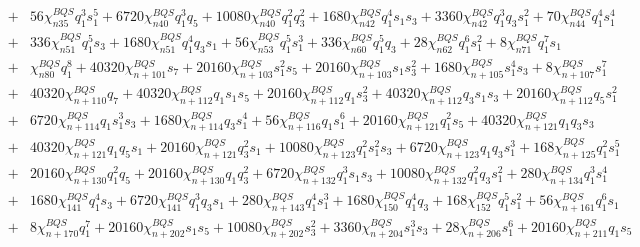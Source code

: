 \documentclass[pdflatex,prd,twocolumn,showpacs,superscriptaddress,nofootinbib]{revtex4-1}
\begin{document}
\begin{widetext}
\begin{eqnarray}
 &+& 56 \chi^{BQS}_{n35} q_{1}^{3} s_{1}^{5} 
 + 6720 \chi^{BQS}_{n40} q_{1}^{3} q_{5} + 10080 \chi^{BQS}_{n40} q_{1}^{2} q_{3}^{2}
 + 1680 \chi^{BQS}_{n42} q_{1}^{4} s_{1} s_{3} + 3360 \chi^{BQS}_{n42} q_{1}^{3} q_{3} s_{1}^{2} + 70 \chi^{BQS}_{n44} q_{1}^{4} s_{1}^{4} \nonumber \\
 &+& 336 \chi^{BQS}_{n51} q_{1}^{5} s_{3} + 1680 \chi^{BQS}_{n51} q_{1}^{4} q_{3} s_{1} + 56 \chi^{BQS}_{n53} q_{1}^{5} s_{1}^{3} 
 + 336 \chi^{BQS}_{n60} q_{1}^{5} q_{3} + 28 \chi^{BQS}_{n62} q_{1}^{6} s_{1}^{2}+ 8 \chi^{BQS}_{n71} q_{1}^{7} s_{1} \nonumber \\
 &+& \chi^{BQS}_{n80} q_{1}^{8} 
 + 40320 \chi^{BQS}_{n+101} s_{7} + 20160 \chi^{BQS}_{n+103} s_{1}^{2} s_{5} + 20160 \chi^{BQS}_{n+103} s_{1} s_{3}^{2} + 1680 \chi^{BQS}_{n+105} s_{1}^{4} s_{3} + 8 \chi^{BQS}_{n+107} s_{1}^{7} \nonumber \\
 &+& 40320 \chi^{BQS}_{n+110} q_{7}  
 + 40320 \chi^{BQS}_{n+112} q_{1} s_{1} s_{5} + 20160 \chi^{BQS}_{n+112} q_{1} s_{3}^{2} + 40320 \chi^{BQS}_{n+112} q_{3} s_{1} s_{3} 
 + 20160 \chi^{BQS}_{n+112} q_{5} s_{1}^{2} \nonumber \\
 &+& 6720 \chi^{BQS}_{n+114} q_{1} s_{1}^{3} s_{3} + 1680 \chi^{BQS}_{n+114} q_{3} s_{1}^{4} 
 + 56 \chi^{BQS}_{n+116} q_{1} s_{1}^{6} + 20160 \chi^{BQS}_{n+121} q_{1}^{2} s_{5} + 40320 \chi^{BQS}_{n+121} q_{1} q_{3} s_{3} \nonumber \\
 &+& 40320 \chi^{BQS}_{n+121} q_{1} q_{5} s_{1} + 20160 \chi^{BQS}_{n+121} q_{3}^{2} s_{1} + 10080 \chi^{BQS}_{n+123} q_{1}^{2} s_{1}^{2} s_{3} 
 + 6720 \chi^{BQS}_{n+123} q_{1} q_{3} s_{1}^{3} + 168 \chi^{BQS}_{n+125} q_{1}^{2} s_{1}^{5} \nonumber \\
 &+& 20160 \chi^{BQS}_{n+130} q_{1}^{2} q_{5} 
 + 20160 \chi^{BQS}_{n+130} q_{1} q_{3}^{2} + 6720 \chi^{BQS}_{n+132} q_{1}^{3} s_{1} s_{3} + 10080 \chi^{BQS}_{n+132} q_{1}^{2} q_{3} s_{1}^{2} 
 + 280 \chi^{BQS}_{n+134} q_{1}^{3} s_{1}^{4} \nonumber \\
 &+& 1680 \chi^{BQS}_{141} q_{1}^{4} s_{3} + 6720 \chi^{BQS}_{141} q_{1}^{3} q_{3} s_{1}
 + 280 \chi^{BQS}_{n+143} q_{1}^{4} s_{1}^{3} + 1680 \chi^{BQS}_{150} q_{1}^{4} q_{3} + 168 \chi^{BQS}_{152} q_{1}^{5} s_{1}^{2} 
 + 56 \chi^{BQS}_{n+161} q_{1}^{6} s_{1} \nonumber \\
 &+& 8 \chi^{BQS}_{n+170} q_{1}^{7} + 20160 \chi^{BQS}_{n+202} s_{1} s_{5}
 + 10080 \chi^{BQS}_{n+202} s_{3}^{2} + 3360 \chi^{BQS}_{n+204} s_{1}^{3} s_{3} + 28 \chi^{BQS}_{n+206} s_{1}^{6} 
+ 20160 \chi^{BQS}_{n+211} q_{1} s_{5} \nonumber \\

\end{eqnarray}
\end{widetext}
\end{document}
